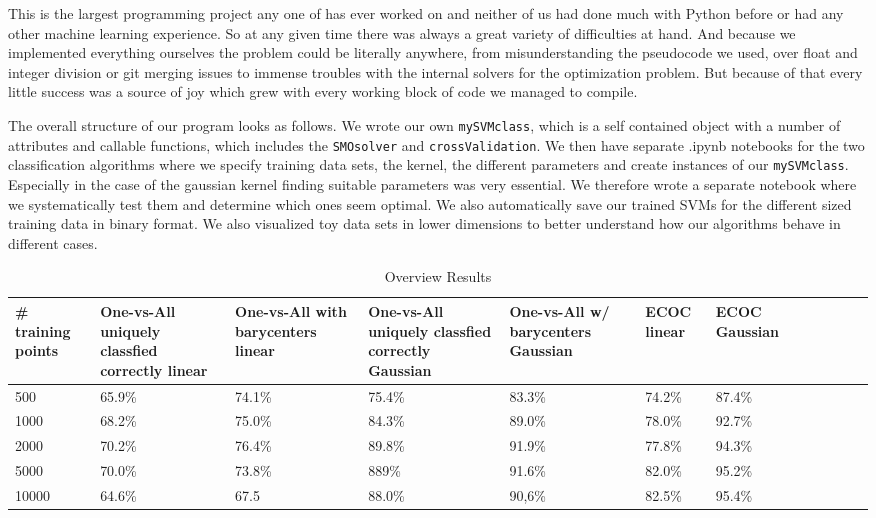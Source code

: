 This is the largest programming project any one of has ever worked on and neither of us had done much with Python before or had any other machine learning experience. So at any given time there was always a great variety of difficulties at hand. And because we implemented everything ourselves the problem could be literally anywhere, from misunderstanding the pseudocode we used, over float and integer division or git merging issues to immense troubles with the internal solvers for the optimization problem. But because of that every little success was a source of joy which grew with every working block of code we managed to compile.

\smallskip
The overall structure of our program looks as follows. We wrote our own \texttt{mySVMclass}, which is a self contained object with a number of attributes and callable functions, which includes the \texttt{SMOsolver} and \texttt{crossValidation}. We then have separate .ipynb notebooks for the two classification algorithms where we specify training data sets, the kernel, the different parameters and create instances of our \texttt{mySVMclass}. Especially in the case of the gaussian kernel finding suitable parameters was very essential. We therefore wrote a separate notebook where we systematically test them and determine which ones seem optimal. We also automatically save our trained SVMs for the different sized training data in binary format. We also visualized toy data sets in lower dimensions to better understand how our algorithms behave in different cases.

\begin{table}[ht!]
	\centering
	\caption{Overview Results}
	\begin{tabular}{|l|l|l|l|l|l|l|l|l|l|l|l|} \hline
		\multicolumn{1}{|p{2cm}|}{\vspace*{.4 cm}\# training points} &
		\multicolumn{1}{p{2cm}|}{One-vs-All uniquely classfied correctly linear} &
		\multicolumn{1}{p{2cm}|}{One-vs-All with barycenters linear} &
		\multicolumn{1}{p{2cm}|}{One-vs-All uniquely classfied correctly Gaussian} &
		\multicolumn{1}{p{2cm}|}{One-vs-All w/ barycenters Gaussian} &
		\multicolumn{1}{p{2cm}|}{\vspace*{.4 cm}ECOC linear} &
		\multicolumn{1}{p{2cm}|}{\vspace*{.4 cm}ECOC Gaussian} \\ \hline \hline
		500	& 65.9\% & 74.1\% & 75.4\% & 83.3\% & 74.2\% & 87.4\% \\ \hline
		1000	& 68.2\% & 75.0\% & 84.3\% & 89.0\% & 78.0\% & 92.7\% \\ \hline
		2000	& 70.2\% & 76.4\% & 89.8\% & 91.9\% & 77.8\% & 94.3\% \\ \hline
		5000	& 70.0\% & 73.8\% & 889\% & 91.6\% & 82.0\% & 95.2\% \\ \hline
		10000	& 64.6\% & 67.5 & 88.0\% & 90,6\% & 82.5\% & 95.4\% \\ \hline
	\end{tabular}
\end{table}

